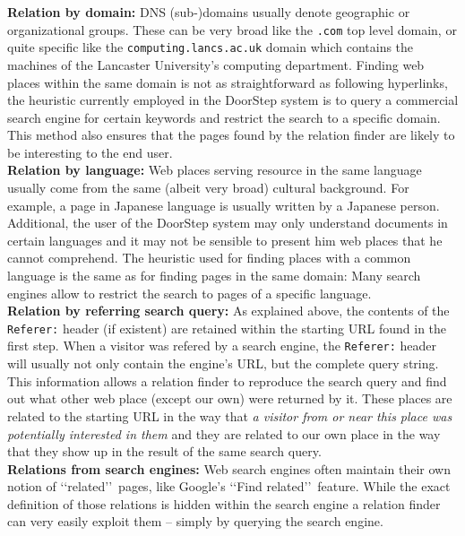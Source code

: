 \documentclass[a4paper]{danarticle}
\theoremstyle{remark}
\begin{document}
    \textbf{Relation by domain:} DNS (sub-)domains usually denote geographic or 
    organizational groups. These can be very broad like the \verb$.com$ top 
    level domain, or quite specific like the \verb$computing.lancs.ac.uk$ domain 
    which contains the machines of the Lancaster University's computing 
    department. Finding web places within the same domain is not as 
    straightforward as following hyperlinks, the heuristic currently employed 
    in the DoorStep system is to query a commercial search engine for certain 
    keywords and restrict the search to a specific domain. This method also 
    ensures that the pages found by the relation finder are likely to be 
    interesting to the end user.
    \\
    
    \textbf{Relation by language:} Web places serving resource in the same 
    language usually come from the same (albeit very broad) cultural background. 
    For example, a page in Japanese language is usually written by a Japanese 
    person. Additional, the user of the DoorStep system may only understand 
    documents in certain languages and it may not be sensible to present him web 
    places that he cannot comprehend. The heuristic used for finding places with 
    a common language is the same as for finding pages in the same domain: Many 
    search engines allow to restrict the search to pages of a specific language.
    \\
    
    \textbf{Relation by referring search query:} As explained above, the 
    contents of the \verb$Referer:$ header (if existent) are retained within the 
    starting URL found in the first step. When a visitor was refered by a search 
    engine, the \verb$Referer:$ header will usually not only contain the 
    engine's URL, but the complete query string. This information allows a 
    relation finder to reproduce the search query and find out what other web 
    place (except our own) were returned by it. These places are related to the 
    starting URL in the way that \textit{a visitor from or near this place was 
    potentially interested in them} and they are related to our own place in the 
    way that they show up in the result of the same search query.
    \\
    
    \textbf{Relations from search engines:} Web search engines often maintain 
    their own notion of \lq\lq related\rq\rq\ pages, like Google's 
    \lq\lq Find related\rq\rq\ feature. While the exact definition of those 
    relations is hidden within the search engine a relation finder can very 
    easily exploit them -- simply by querying the search engine.
    \\
    
\end{document}
